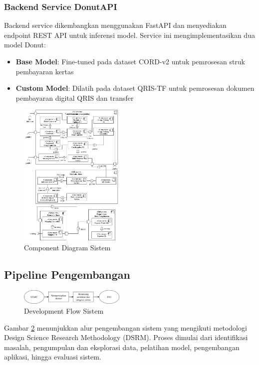 \subsubsection{Backend Service DonutAPI}
Backend service dikembangkan menggunakan FastAPI dan menyediakan endpoint REST API untuk inferensi model. Service ini mengimplementasikan dua model Donut:
\begin{itemize}
    \item \textbf{Base Model}: Fine-tuned pada dataset CORD-v2 untuk pemrosesan struk pembayaran kertas
    \item \textbf{Custom Model}: Dilatih pada dataset QRIS-TF untuk pemrosesan dokumen pembayaran digital QRIS dan transfer
\end{itemize}

\begin{figure}[htbp]
    \centerline{\includegraphics[width=0.45\textwidth]{images/component-diagram.png}}
    \caption{Component Diagram Sistem}
    \label{fig:component}
\end{figure}

\subsection{Pipeline Pengembangan}
\begin{figure}[htbp]
    \centerline{\includegraphics[width=0.45\textwidth]{images/design-flow.png}}
    \caption{Development Flow Sistem}
    \label{fig:devflow}
\end{figure}

Gambar \ref{fig:devflow} menunjukkan alur pengembangan sistem yang mengikuti metodologi Design Science Research Methodology (DSRM). Proses dimulai dari identifikasi masalah, pengumpulan dan eksplorasi data, pelatihan model, pengembangan aplikasi, hingga evaluasi sistem.


